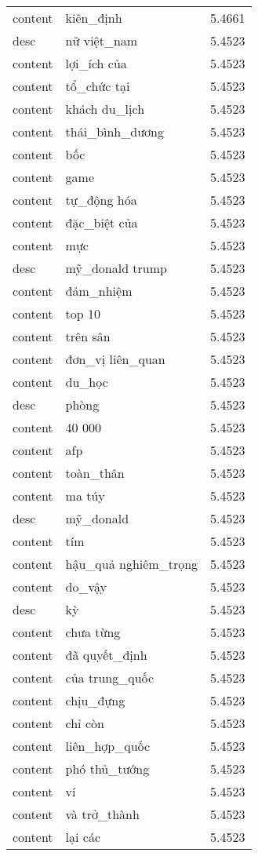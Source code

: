 \documentclass{article}
\begin{document}
\begin{tabular}{lll}
content & kiên\_định & 5.4661\\
desc & nữ việt\_nam & 5.4523\\
content & lợi\_ích của & 5.4523\\
content & tổ\_chức tại & 5.4523\\
content & khách du\_lịch & 5.4523\\
content & thái\_bình\_dương & 5.4523\\
content & bốc & 5.4523\\
content & game & 5.4523\\
content & tự\_động hóa & 5.4523\\
content & đặc\_biệt của & 5.4523\\
content & mực & 5.4523\\
desc & mỹ\_donald trump & 5.4523\\
content & đảm\_nhiệm & 5.4523\\
content & top 10 & 5.4523\\
content & trên sân & 5.4523\\
content & đơn\_vị liên\_quan & 5.4523\\
content & du\_học & 5.4523\\
desc & phòng & 5.4523\\
content & 40 000 & 5.4523\\
content & afp & 5.4523\\
content & toàn\_thân & 5.4523\\
content & ma túy & 5.4523\\
desc & mỹ\_donald & 5.4523\\
content & tím & 5.4523\\
content & hậu\_quả nghiêm\_trọng & 5.4523\\
content & do\_vậy & 5.4523\\
desc & kỳ & 5.4523\\
content & chưa từng & 5.4523\\
content & đã quyết\_định & 5.4523\\
content & của trung\_quốc & 5.4523\\
content & chịu\_đựng & 5.4523\\
content & chỉ còn & 5.4523\\
content & liên\_hợp\_quốc & 5.4523\\
content & phó thủ\_tướng & 5.4523\\
content & ví & 5.4523\\
content & và trở\_thành & 5.4523\\
content & lại các & 5.4523\\

\end{tabular}
\end{document}
